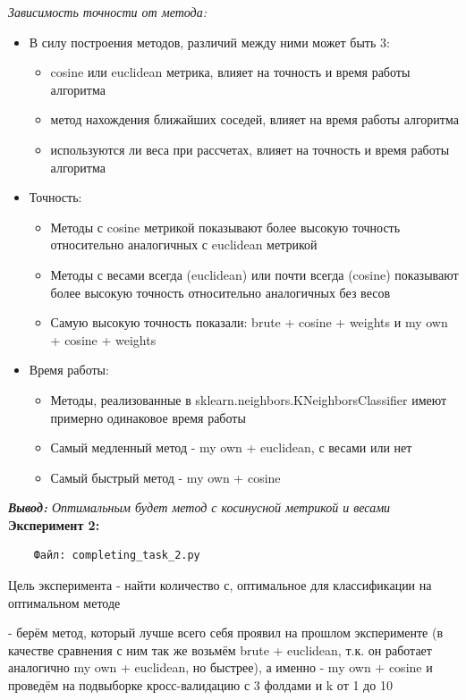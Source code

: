 \documentclass{article}
\begin{document}
\textit{\large Зависимость точности от метода:}
\begin{itemize}
    \item В силу построения методов, различий между ними может быть 3:\begin{itemize}
        \item cosine или euclidean метрика, влияет на точность и время работы алгоритма
        \item метод нахождения ближайших соседей, влияет на время работы алгоритма
        \item используются ли веса при рассчетах, влияет на точность и время работы алгоритма
    \end{itemize}
    \item Точность: \begin{itemize}
        \item Методы с cosine метрикой показывают более высокую точность относительно аналогичных с euclidean метрикой
        \item Методы с весами всегда (euclidean) или почти всегда (cosine) показывают более высокую точность относительно аналогичных без весов
        \item Самую высокую точность показали: brute + cosine + weights и my own + cosine + weights
    \end{itemize}
    \item Время работы: \begin{itemize}
        \item Методы, реализованные в sklearn.neighbors.KNeighborsClassifier имеют примерно одинаковое время работы
        \item Самый медленный метод - my own + euclidean, с весами или нет
        \item Самый быстрый метод - my own + cosine
    \end{itemize}
\end{itemize}

\textit{\large\textbf{Вывод: }Оптимальным будет метод с косинусной метрикой и весами} \\

\textbf{\Large Эксперимент 2:}  \\
\begin{verbatim}
    Файл: completing_task_2.py
\end{verbatim}
Цель эксперимента - найти количество с, оптимальное для классификации на оптимальном методе

 - берём метод, который лучше всего себя проявил на прошлом эксперименте (в качестве сравнения с ним так же возьмём brute + euclidean, т.к. он работает аналогично my own + euclidean, но быстрее), а именно - my own + cosine и проведём на подвыборке кросс-валидацию с 3 фолдами и k от 1 до 10
\end{document}
